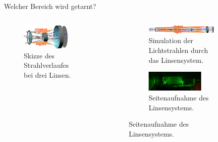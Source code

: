 \begin{frame}{Welcher Bereich wird getarnt?}
    \begin{columns}
        \begin{column}{0.3\textwidth}
            \begin{figure}
                \centering
                \includegraphics[width=0.8\textwidth]{images/3linsen-skizze.png}
                \caption{Skizze des Strahlverlaufes\\ bei drei Linsen.}
            \end{figure}
        \end{column}
        \begin{column}{0.69\textwidth}
            \begin{figure}
                \centering
                \begin{subfigure}{\textwidth}
                    \centering
                    \caption{Simulation der Lichtstrahlen durch das Linsensystem.}
                    \includegraphics[width=\textwidth]{images/skizze.png}
                \end{subfigure}
                \begin{subfigure}{\textwidth}
                    \centering
                    \caption{Seitenaufnahme des Linsensystems.}
                    \includegraphics[width=0.8\textwidth]{images/laser-seite.jpg}
                \end{subfigure}
            \end{figure}

        \end{column}
    \end{columns}

\end{frame}
